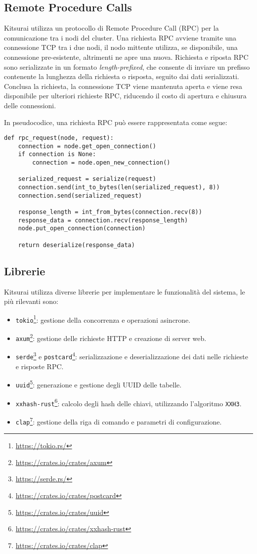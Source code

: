 \subsection{Remote Procedure Calls}
\label{subsec:rpc}

Kitsurai utilizza un protocollo di Remote Procedure Call (RPC) per la comunicazione tra i nodi del cluster.
Una richiesta RPC avviene tramite una connessione TCP tra i due nodi, il nodo mittente utilizza, se disponibile, una connessione pre-esistente, altrimenti ne apre una nuova.
Richiesta e riposta RPC sono serializzate in un formato \emph{length-prefixed}, che consente di inviare un prefisso contenente la lunghezza della richiesta o risposta, seguito dai dati serializzati.
Conclusa la richiesta, la connessione TCP viene mantenuta aperta e viene resa disponibile per ulteriori richieste RPC, riducendo il costo di apertura e chiusura delle connessioni.

In pseudocodice, una richiesta RPC può essere rappresentata come segue:
\begin{verbatim}
def rpc_request(node, request):
    connection = node.get_open_connection()
    if connection is None:
        connection = node.open_new_connection()

    serialized_request = serialize(request)
    connection.send(int_to_bytes(len(serialized_request), 8))
    connection.send(serialized_request)

    response_length = int_from_bytes(connection.recv(8))
    response_data = connection.recv(response_length)
    node.put_open_connection(connection)

    return deserialize(response_data)
\end{verbatim}

\subsection{Librerie}
\label{subsec:librerie}

Kitsurai utilizza diverse librerie per implementare le funzionalità del sistema, le più rilevanti sono:
\begin{itemize}
    \item \texttt{tokio}\footnote{\url{https://tokio.rs/}}: gestione della concorrenza e operazioni asincrone.
    \item \texttt{axum}\footnote{\url{https://crates.io/crates/axum}}: gestione delle richieste HTTP e creazione di server web.
    \item \texttt{serde}\footnote{\url{https://serde.rs/}} e \texttt{postcard}\footnote{\url{https://crates.io/crates/postcard}}: serializzazione e deserializzazione dei dati nelle richieste e risposte RPC.
    \item \texttt{uuid}\footnote{\url{https://crates.io/crates/uuid}}: generazione e gestione degli UUID delle tabelle.
    \item \texttt{xxhash-rust}\footnote{\url{https://crates.io/crates/xxhash-rust}}: calcolo degli hash delle chiavi, utilizzando l'algoritmo \texttt{XXH3}.
    \item \texttt{clap}\footnote{\url{https://crates.io/crates/clap}}: gestione della riga di comando e parametri di configurazione.
\end{itemize}
